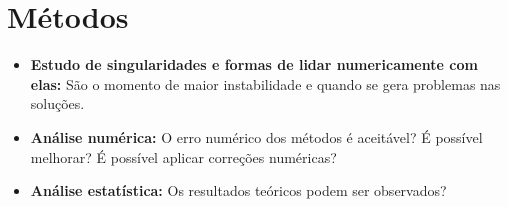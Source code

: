 \chapter{Métodos}

\begin{itemize}
      \item \textbf{Estudo de singularidades e formas de lidar numericamente com elas:} São o momento de maior instabilidade e quando se gera problemas nas soluções.
      \item \textbf{Análise numérica:} O erro numérico dos métodos é aceitável? É possível melhorar? É possível aplicar correções numéricas?
      \item \textbf{Análise estatística:} Os resultados teóricos podem ser observados?
\end{itemize}

